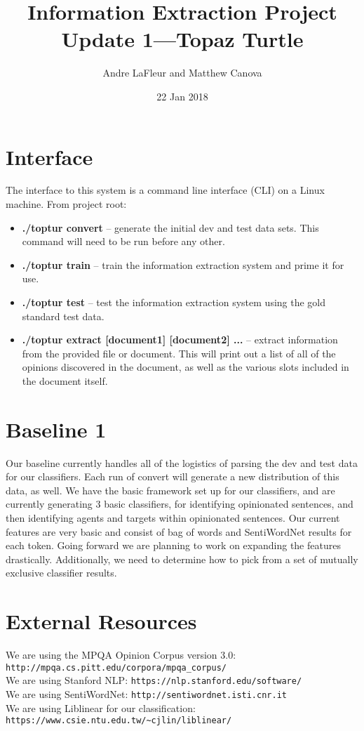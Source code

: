 \documentclass{article}
\title{Information Extraction Project Update 1---Topaz Turtle}
\author{Andre LaFleur and Matthew Canova}
\date{22 Jan 2018}
\begin{document}
	\maketitle


 \section{Interface}

    The interface to this system is a command line interface (CLI) on a Linux machine. From project root:
    
    \begin{itemize}
    \item \textbf{./toptur convert} -- generate the initial dev and test data sets. This command will need to be run before any other.
    	\item \textbf{./toptur train} -- train the information extraction system and prime it for use.         
	\item \textbf{./toptur test} -- test the information extraction system using the gold standard test data.
        \item \textbf{./toptur extract \textnormal{[document1] [document2] ...}} -- extract information from the provided file or document. This will print out a list of all of the opinions discovered in the document, as well as the various slots included in the document itself.
    \end{itemize}
    
   
    \section{Baseline 1}
    
    Our baseline currently handles all of the logistics of parsing the dev and test data for our classifiers. Each run of convert will generate a new distribution of this data, as well. We have the basic framework set up for our classifiers, and are currently generating 3 basic classifiers, for identifying opinionated sentences, and then identifying agents and targets within opinionated sentences. 
    Our current features are very basic and consist of bag of words and SentiWordNet results for each token. Going forward we are planning to work on expanding the features drastically. Additionally, we need to determine how to pick from a set of mutually exclusive classifier results. 
  
   
\section{External Resources}
We are using the MPQA Opinion Corpus version 3.0: \verb|http://mpqa.cs.pitt.edu/corpora/mpqa_corpus/| \\
We are using Stanford NLP: \verb|https://nlp.stanford.edu/software/| \\
We are using SentiWordNet: \verb|http://sentiwordnet.isti.cnr.it| \\
We are using Liblinear for our classification: \verb|https://www.csie.ntu.edu.tw/~cjlin/liblinear/| \\
  
\end{document}
